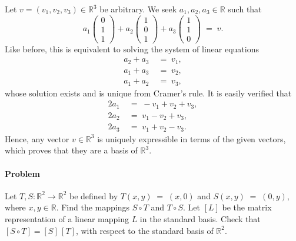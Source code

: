 \documentclass[10pt]{article}
\newcounter{prob}
\def\problem{\stepcounter{prob}\paragraph{Problem \arabic{prob}}}
\begin{document}
\begin{enumerate}
                Let $v = (v_1, v_2, v_3) \in \mathbb{R}^3$ be arbitrary. We seek $a_1, a_2, a_3 \in \mathbb{R}$ such that
                \[
                a_1\begin{pmatrix}0\\1\\1\end{pmatrix} +
                a_2\begin{pmatrix}1\\0\\1\end{pmatrix} +
                a_3\begin{pmatrix}1\\1\\0\end{pmatrix} \;=\; v.
                \]
                Like before, this is equivalent to solving the system of linear equations
                \begin{align*}
                        a_2 + a_3 \;&=\; v_1, \\
                        a_1 + a_3 \;&=\; v_2, \\
                        a_1 + a_2 \;&=\; v_3,
                \end{align*}
                whose solution exists and is unique from Cramer's rule. It is easily verified that 
                \begin{align*}
                        2a_1 \;&=\; -v_1 + v_2 + v_3, \\
                        2a_2 \;&=\; v_1 - v_2 + v_3, \\
                        2a_3 \;&=\; v_1 + v_2 - v_3.
                \end{align*}
                Hence, any vector $v \in \mathbb{R}^3$ is uniquely expressible in terms of the given vectors, which proves that they
                are a basis of $\mathbb{R}^3$.
        \end{enumerate}

        \problem Let $T, S\colon \mathbb{R}^2 \to \mathbb{R}^2$ be defined by $T(x, y) \;=\; (x, 0)$ and $S(x, y) \;=\; (0, y)$, where
        $x, y \in \mathbb{R}$. Find the mappings $S\circ T$ and $T\circ S$. Let $[L]$ be the matrix representation of a linear
        mapping $L$ in the standard basis. Check that $[S \circ T] = [S]\,[T]$, with respect to the standard basis of $\mathbb{R}^2$.
\end{document}
